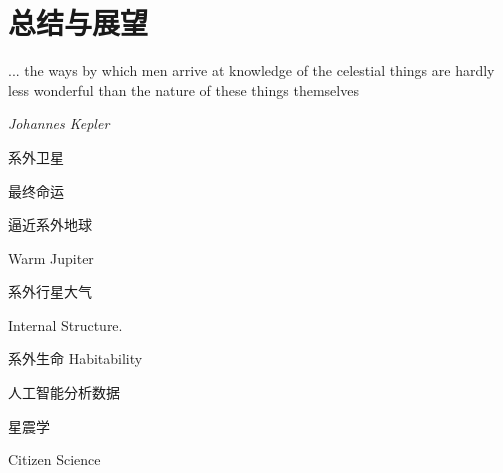 \chapter{总结与展望}

\epigraph{... the ways by which men arrive at knowledge of the celestial things are hardly less wonderful than the nature of these things themselves}{\textit{Johannes Kepler}}

系外卫星



最终命运

逼近系外地球

Warm Jupiter

系外行星大气

Internal Structure.

系外生命 Habitability

人工智能分析数据

星震学

Citizen Science

